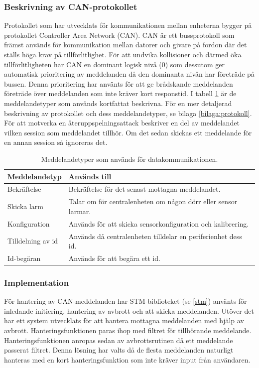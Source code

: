 \documentclass{article}
\begin{document}
\subsubsection{Beskrivning av CAN-protokollet}
Protokollet som har utvecklats för kommunikationen mellan enheterna bygger på protokollet Controller Area Network (CAN).
CAN är ett bussprotokoll som främst används för kommunikation mellan datorer och givare på fordon där det ställs höga krav på tillförlitlighet.
För att undvika kollisioner och därmed öka tillförlitligheten har CAN en dominant logisk nivå (0) som dessutom ger automatisk prioritering av meddelanden då den dominanta nivån har företräde på bussen.
Denna prioritering har använts för att ge brådskande meddelanden företräde över meddelanden som inte kräver kort responstid. I tabell \ref{tab:meddelandetyper} är de meddelandetyper som används kortfattat beskrivna. För en mer detaljerad beskrivning av protokollet och dess meddelandetyper, se bilaga \ref{bilaga:protokoll}. För att motverka en återuppspelningsattack beskriver en del av meddelandet vilken session som meddelandet tillhör. Om det sedan skickas ett meddelande för en annan session så ignoreras det.



\begin{table}[H]
	\centering
    \begin{tabular}{|l|p{}|}

		\hline
		Meddelandetyp & Används till \\ \hline \hline
		Bekräftelse		& Bekräftelse för det senast mottagna meddelandet. \\ \hline
		Skicka larm		& Talar om för centralenheten om någon dörr eller sensor larmar. \\ \hline
		Konfiguration		& Används för att skicka sensorkonfiguration och kalibrering. \\ \hline
		Tilldelning av id		& Används då centralenheten tilldelar en periferienhet dess id. \\ \hline
		Id-begäran		& Används för att begära ett id. \\ \hline

	\end{tabular}
	\caption{Meddelandetyper som används för datakommunikationen.}
	\label{tab:meddelandetyper}
\end{table}


\subsubsection{Implementation}
För hantering av CAN-meddelanden har STM-biblioteket (se \ref{stm}) använts för inledande initiering,
hantering av avbrott och att skicka meddelanden.
Utöver det har ett system utvecklats för att hantera mottagna meddelanden med hjälp av avbrott.
Hanteringsfunktionen paras ihop med filtret för tillhörande meddelande.
Hanteringsfunktionen anropas sedan av avbrottsrutinen då ett meddelande passerat filtret.
Denna lösning har valts då de flesta meddelanden naturligt hanteras med en kort hanteringsfunktion
som inte kräver input från användaren.
\end{document}
